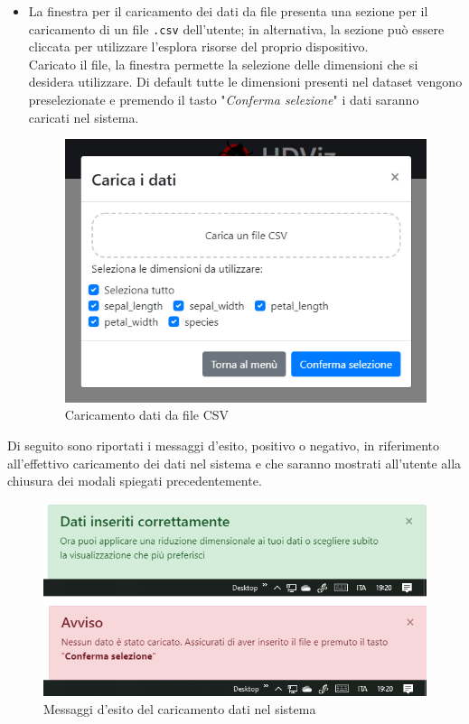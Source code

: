 \begin{itemize}
	\item La finestra per il caricamento dei dati da file  presenta una sezione  per il caricamento di un file \texttt{.csv} dell'utente; in alternativa, la sezione può essere cliccata per utilizzare l'esplora risorse del proprio dispositivo.\\ Caricato il file, la finestra permette la selezione delle dimensioni che si desidera utilizzare. Di default tutte le dimensioni presenti nel dataset vengono preselezionate e premendo il tasto "\textit{Conferma selezione}" i dati saranno caricati nel sistema.
	\begin{figure}[H]
		\includegraphics[scale=0.7]{Images/CaricamentoCSV.png}
		\centering
		\caption{Caricamento dati da file CSV}
	\end{figure}
\end{itemize}

Di seguito sono riportati i messaggi d'esito, positivo o negativo, in riferimento all'effettivo caricamento dei dati nel sistema e che saranno mostrati all'utente alla chiusura dei modali spiegati precedentemente.

	\begin{figure}[H]
		\includegraphics[scale=0.8]{Images/doubleEsito.png}
		\centering
		\caption{Messaggi d'esito del caricamento dati nel sistema}
	\end{figure}

